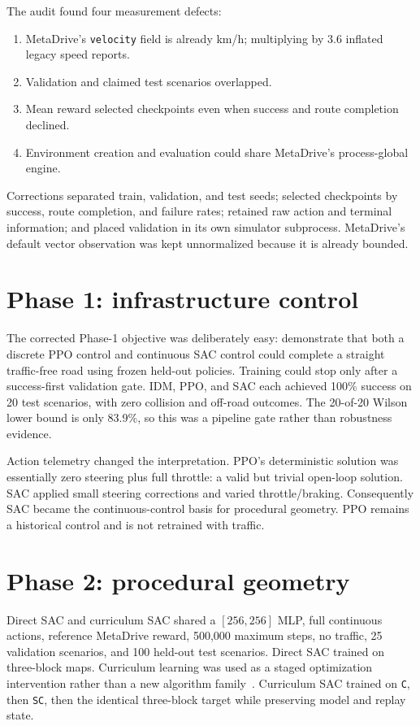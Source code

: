 \documentclass[10pt,twocolumn]{article}
\begin{document}
The audit found four measurement defects:
\begin{enumerate}
\item MetaDrive's \texttt{velocity} field is already km/h; multiplying by 3.6 inflated
legacy speed reports.
\item Validation and claimed test scenarios overlapped.
\item Mean reward selected checkpoints even when success and route completion declined.
\item Environment creation and evaluation could share MetaDrive's process-global engine.
\end{enumerate}

Corrections separated train, validation, and test seeds; selected checkpoints by success,
route completion, and failure rates; retained raw action and terminal information; and
placed validation in its own simulator subprocess. MetaDrive's default vector observation
was kept unnormalized because it is already bounded.

\section{Phase 1: infrastructure control}
The corrected Phase-1 objective was deliberately easy: demonstrate that both a discrete
PPO control and continuous SAC control could complete a straight traffic-free road using
frozen held-out policies. Training could stop only after a success-first validation gate.
IDM, PPO, and SAC each achieved 100\% success on 20 test scenarios, with zero collision
and off-road outcomes. The 20-of-20 Wilson lower bound is only 83.9\%, so this was a
pipeline gate rather than robustness evidence.

Action telemetry changed the interpretation. PPO's deterministic solution was essentially
zero steering plus full throttle: a valid but trivial open-loop solution. SAC applied
small steering corrections and varied throttle/braking. Consequently SAC became the
continuous-control basis for procedural geometry. PPO remains a historical control and
is not retrained with traffic.

\section{Phase 2: procedural geometry}
Direct SAC and curriculum SAC shared a $[256,256]$ MLP, full continuous actions, reference
MetaDrive reward, 500,000 maximum steps, no traffic, 25 validation scenarios, and 100
held-out test scenarios. Direct SAC trained on three-block maps. Curriculum learning was
used as a staged optimization intervention rather than a new algorithm
family~\cite{ozturk2021curriculum}. Curriculum SAC trained
on \texttt{C}, then \texttt{SC}, then the identical three-block target while preserving
model and replay state.
\end{document}
